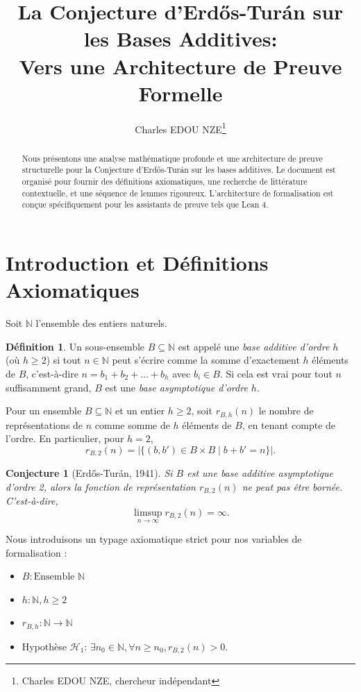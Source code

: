 \documentclass[12pt, a4paper]{article}
\title{La Conjecture d'Erd\H{o}s-Tur\'{a}n sur les Bases Additives: \\ Vers une Architecture de Preuve Formelle}
\author{Charles EDOU NZE\thanks{Charles EDOU NZE, chercheur indépendant}}
\date{}
\newtheorem{conjecture}[theorem]{Conjecture}
\theoremstyle{definition}
\newtheorem{definition}[theorem]{Définition}
\begin{document}
\maketitle

\begin{abstract}
Nous présentons une analyse mathématique profonde et une architecture de preuve structurelle pour la Conjecture d'Erd\H{o}s-Tur\'{a}n sur les bases additives. Le document est organisé pour fournir des définitions axiomatiques, une recherche de littérature contextuelle, et une séquence de lemmes rigoureux. L'architecture de formalisation est conçue spécifiquement pour les assistants de preuve tels que Lean 4.
\end{abstract}

\section{Introduction et Définitions Axiomatiques}
Soit $\mathbb{N}$ l'ensemble des entiers naturels.
\begin{definition}
Un sous-ensemble $B \subseteq \mathbb{N}$ est appelé une \emph{base additive d'ordre $h$} (où $h \ge 2$) si tout $n \in \mathbb{N}$ peut s'écrire comme la somme d'exactement $h$ éléments de $B$, c'est-à-dire $n = b_1 + b_2 + \dots + b_h$ avec $b_i \in B$. Si cela est vrai pour tout $n$ suffisamment grand, $B$ est une \emph{base asymptotique d'ordre $h$}.
\end{definition}

Pour un ensemble $B \subseteq \mathbb{N}$ et un entier $h \ge 2$, soit $r_{B,h}(n)$ le nombre de représentations de $n$ comme somme de $h$ éléments de $B$, en tenant compte de l'ordre. En particulier, pour $h=2$,
$$ r_{B,2}(n) = |\{(b, b') \in B \times B \mid b + b' = n\}|. $$

\begin{conjecture}[Erd\H{o}s-Tur\'{a}n, 1941]
Si $B$ est une base additive asymptotique d'ordre 2, alors la fonction de représentation $r_{B,2}(n)$ ne peut pas être bornée. C'est-à-dire,
$$ \limsup_{n \to \infty} r_{B,2}(n) = \infty. $$
\end{conjecture}

Nous introduisons un typage axiomatique strict pour nos variables de formalisation :
\begin{itemize}
    \item $B : \text{Ensemble } \mathbb{N}$
    \item $h : \mathbb{N}, h \ge 2$
    \item $r_{B,h} : \mathbb{N} \to \mathbb{N}$
    \item Hypothèse $\mathcal{H}_1$: $\exists n_0 \in \mathbb{N}, \forall n \ge n_0, r_{B,2}(n) > 0$.
\end{itemize}
\end{document}

